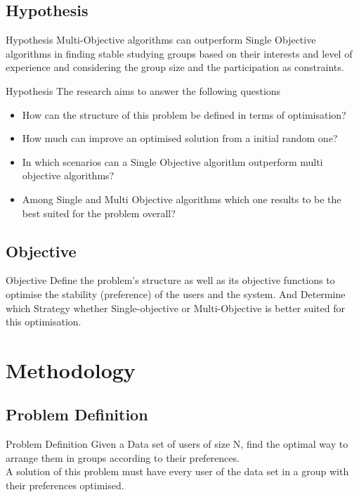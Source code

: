 \documentclass{beamer}
\begin{document}
    \subsection{Hypothesis}
    \begin{frame}{Hypothesis}
        Multi-Objective algorithms can outperform Single Objective algorithms in finding stable studying groups based on their interests and level of experience and considering the group size and the participation as constraints.\\
    \end{frame}
    \begin{frame}{Hypothesis}
    The research aims to answer the following questions
        \begin{itemize}
            \item How can the structure of this problem be defined in terms of optimisation? 
            \item How much can improve an optimised solution from a initial random one? %
            \item In which scenarios can a Single Objective algorithm outperform multi objective algorithms?
            \item Among Single and Multi Objective algorithms which one results to be the best suited for the problem overall?
        \end{itemize}
    \end{frame}
    
    \subsection{Objective}
    \begin{frame}{Objective}
        Define the problem's structure as well as its objective functions to optimise the stability (preference) of the users and the system. And Determine which Strategy whether Single-objective or Multi-Objective is better suited for this optimisation.
    \end{frame}
    
\section{Methodology}

    \subsection{Problem Definition}
    \begin{frame}{Problem Definition}
        Given a Data set of users of size N, find the optimal way to arrange them in groups according to their preferences.\\
    
        A solution of this problem must have every user of the data set in a group with their preferences optimised.\\
    \end{frame}
\end{document}
